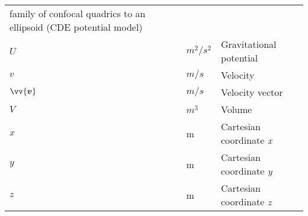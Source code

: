 \begin{longtable}[l]{p{100pt} p{70pt} p{150pt}}
                                          family of confocal quadrics to an ellipsoid (CDE potential model)                                  \\
    $U$              & $m^2/s^2$        & Gravitational potential                           \\
    $v$              & $m/s$            & Velocity                                          \\
    $\vv{\bm{v}}$    & $m/s$            & Velocity vector                                   \\
    $V$              & $m^3$            & Volume                                            \\
    $x$              & m                & Cartesian coordinate \emph{x}                     \\
    $y$              & m                & Cartesian coordinate \emph{y}                     \\
    $z$              & m                & Cartesian coordinate \emph{z}                     \\
\end{longtable}
\vspace{1cm}

